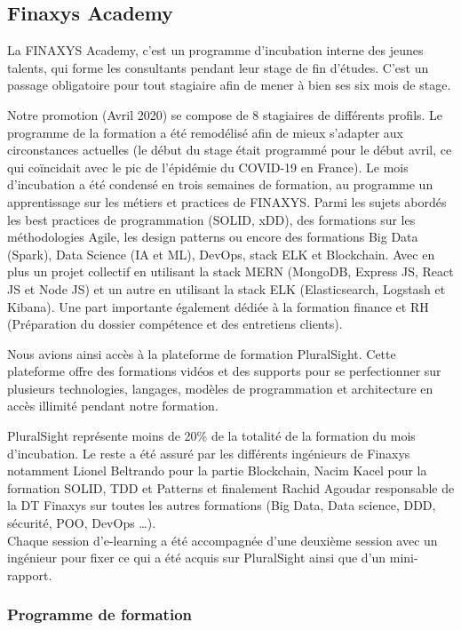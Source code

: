 \subsection{Finaxys Academy} 
\par La FINAXYS Academy, c’est un programme d'incubation interne des jeunes talents, qui forme les consultants pendant leur stage de fin d’études. C'est un passage obligatoire pour tout stagiaire afin de mener à bien ses six mois de stage. 
\par Notre promotion (Avril 2020) se compose de 8 stagiaires de différents profils. Le programme de la formation a été remodélisé afin de mieux s'adapter aux circonstances actuelles (le début du stage était programmé pour le début avril, ce qui coïncidait avec le pic de l'épidémie du COVID-19 en France). Le mois d'incubation a été condensé en trois semaines de formation, au programme un apprentissage sur les métiers et practices de FINAXYS. Parmi les sujets abordés les best practices de programmation (SOLID, xDD), des formations sur les méthodologies Agile, les design patterns ou encore des formations Big Data (Spark), Data Science (IA et ML), DevOps, stack ELK  et Blockchain. Avec en plus un projet collectif en utilisant la stack MERN (MongoDB, Express JS, React JS et Node JS) et un autre en utilisant la stack ELK (Elasticsearch, Logstash et Kibana). Une part importante également dédiée à la formation finance et RH (Préparation du dossier compétence et des entretiens clients). 
\par Nous avions ainsi accès à la plateforme de formation PluralSight. Cette plateforme offre des formations vidéos et des supports pour se perfectionner sur plusieurs technologies, langages, modèles de programmation et architecture en accès illimité pendant notre formation.
\par PluralSight représente moins de 20\% de la totalité de la formation du mois d'incubation. Le reste a été assuré par les différents ingénieurs de Finaxys notamment Lionel Beltrando pour la partie Blockchain, Nacim Kacel pour la formation SOLID, TDD et Patterns et finalement Rachid Agoudar responsable de la DT Finaxys sur toutes les autres formations (Big Data, Data science, DDD, sécurité, POO, DevOps \dots).  \\
Chaque session d'e-learning a été accompagnée d'une deuxième session avec un ingénieur pour fixer ce qui a été acquis sur PluralSight ainsi que d'un mini-rapport.

\pagebreak
\subsubsection{Programme de formation}


